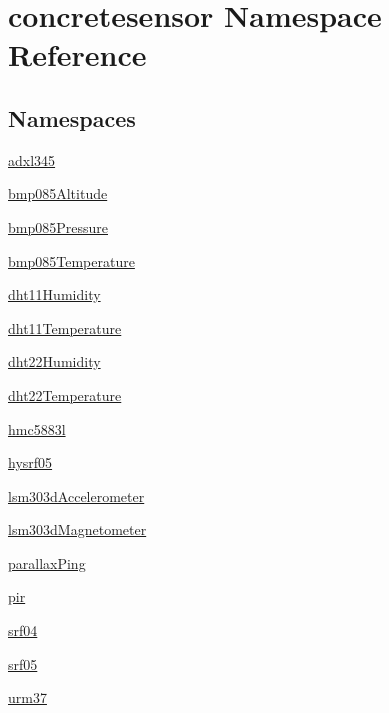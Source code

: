 \hypertarget{namespaceconcretesensor}{}\section{concretesensor Namespace Reference}
\label{namespaceconcretesensor}
\subsection*{Namespaces}
\begin{DoxyCompactItemize}
\item 
 \hyperlink{namespaceconcretesensor_1_1adxl345}{adxl345}
\item 
 \hyperlink{namespaceconcretesensor_1_1bmp085Altitude}{bmp085\+Altitude}
\item 
 \hyperlink{namespaceconcretesensor_1_1bmp085Pressure}{bmp085\+Pressure}
\item 
 \hyperlink{namespaceconcretesensor_1_1bmp085Temperature}{bmp085\+Temperature}
\item 
 \hyperlink{namespaceconcretesensor_1_1dht11Humidity}{dht11\+Humidity}
\item 
 \hyperlink{namespaceconcretesensor_1_1dht11Temperature}{dht11\+Temperature}
\item 
 \hyperlink{namespaceconcretesensor_1_1dht22Humidity}{dht22\+Humidity}
\item 
 \hyperlink{namespaceconcretesensor_1_1dht22Temperature}{dht22\+Temperature}
\item 
 \hyperlink{namespaceconcretesensor_1_1hmc5883l}{hmc5883l}
\item 
 \hyperlink{namespaceconcretesensor_1_1hysrf05}{hysrf05}
\item 
 \hyperlink{namespaceconcretesensor_1_1lsm303dAccelerometer}{lsm303d\+Accelerometer}
\item 
 \hyperlink{namespaceconcretesensor_1_1lsm303dMagnetometer}{lsm303d\+Magnetometer}
\item 
 \hyperlink{namespaceconcretesensor_1_1parallaxPing}{parallax\+Ping}
\item 
 \hyperlink{namespaceconcretesensor_1_1pir}{pir}
\item 
 \hyperlink{namespaceconcretesensor_1_1srf04}{srf04}
\item 
 \hyperlink{namespaceconcretesensor_1_1srf05}{srf05}
\item 
 \hyperlink{namespaceconcretesensor_1_1urm37}{urm37}
\end{DoxyCompactItemize}
